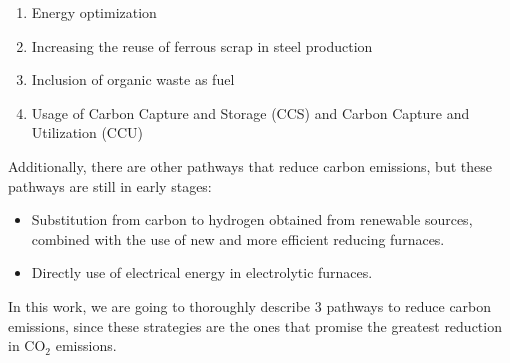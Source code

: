 \begin{enumerate}
\item Energy optimization
\item Increasing the reuse of ferrous scrap in steel production 
\item Inclusion of organic waste as fuel
\item Usage of Carbon Capture and Storage (CCS) and Carbon Capture and Utilization (CCU) 
\end{enumerate}

Additionally, there are other pathways that reduce carbon emissions, but these pathways are still in early stages:

\begin{itemize}
\item Substitution from carbon to hydrogen obtained from renewable sources, combined with the use of new and more efficient reducing furnaces.
\item Directly use of electrical energy in electrolytic furnaces.
\end{itemize}

In this work, we are going to thoroughly describe 3 pathways to reduce carbon emissions, since these strategies are the ones that promise the greatest reduction in CO$_2$ emissions.\autocite{elkerbout2021impact}

